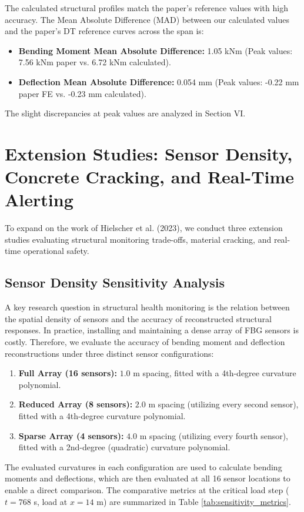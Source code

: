\documentclass[11pt,journal,onecolumn]{IEEEtran}
\begin{document}
The calculated structural profiles match the paper's reference values with high accuracy. The Mean Absolute Difference (MAD) between our calculated values and the paper's DT reference curves across the span is:
\begin{itemize}
    \item \textbf{Bending Moment Mean Absolute Difference:} 1.05 kNm (Peak values: 7.56 kNm paper vs. 6.72 kNm calculated).
    \item \textbf{Deflection Mean Absolute Difference:} 0.054 mm (Peak values: -0.22 mm paper FE vs. -0.23 mm calculated).
\end{itemize}
The slight discrepancies at peak values are analyzed in Section VI.

\section{Extension Studies: Sensor Density, Concrete Cracking, and Real-Time Alerting}
To expand on the work of Hielscher et al. (2023), we conduct three extension studies evaluating structural monitoring trade-offs, material cracking, and real-time operational safety.

\subsection{Sensor Density Sensitivity Analysis}
A key research question in structural health monitoring is the relation between the spatial density of sensors and the accuracy of reconstructed structural responses. In practice, installing and maintaining a dense array of FBG sensors is costly. Therefore, we evaluate the accuracy of bending moment and deflection reconstructions under three distinct sensor configurations:
\begin{enumerate}
    \item \textbf{Full Array (16 sensors):} $1.0$ m spacing, fitted with a 4th-degree curvature polynomial.
    \item \textbf{Reduced Array (8 sensors):} $2.0$ m spacing (utilizing every second sensor), fitted with a 4th-degree curvature polynomial.
    \item \textbf{Sparse Array (4 sensors):} $4.0$ m spacing (utilizing every fourth sensor), fitted with a 2nd-degree (quadratic) curvature polynomial.
\end{enumerate}
The evaluated curvatures in each configuration are used to calculate bending moments and deflections, which are then evaluated at all 16 sensor locations to enable a direct comparison. The comparative metrics at the critical load step ($t=768$ s, load at $x=14$ m) are summarized in Table \ref{tab:sensitivity_metrics}.
\end{document}
